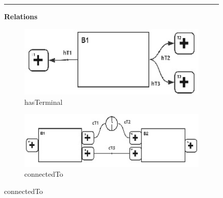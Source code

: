 \documentclass[../main.tex]{subfiles}
\begin{document}
\begin{figure}
  \par\noindent\rule{.9\textwidth}{0.4pt}\vspace{3ex}

  \textbf{Relations}\\[2ex]
  
  \begin{subfigure}[b]{0.3\textwidth}\centering
    \includegraphics[width=1\textwidth]{img/IMFmanual-img015.jpg}
    \caption{hasTerminal}
  \end{subfigure}
  \hspace{2cm}
  \begin{subfigure}[b]{0.4\textwidth}\centering
    \includegraphics[width=1\textwidth]{img/IMFmanual-img016.jpg}
    \caption{connectedTo}
  \end{subfigure}

  \vspace{1cm}


\end{figure}
\end{document}
